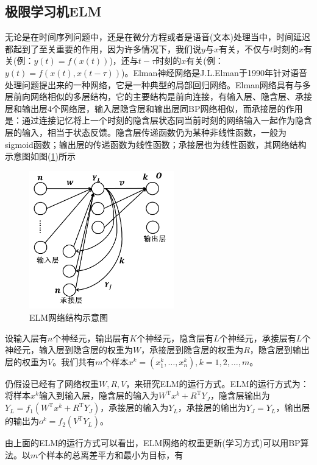 {    \subsection{极限学习机ELM}
        \par
        无论是在时间序列问题中，还是在微分方程或者是语音(文本)处理当中，时间延迟都起到了至关重要的作用，因为许多情况下，我们说$y$与$x$有关，不仅与$t$时刻的$x$有关(例：$y(t) = f(x(t))$)，还与$t-\tau$时刻的$x$有关(例：$y(t) = f(x(t),x(t-\tau))$)。Elman神经网络是J.L.Elman于1990年针对语音处理问题提出来的一种网络，它是一种典型的局部回归网络。Elman网络具有与多层前向网络相似的多层结构，它的主要结构是前向连接，有输入层、隐含层、承接层和输出层4个网络层，输入层隐含层和输出层同BP网络相似，而承接层的作用是：通过连接记忆将上一个时刻的隐含层状态同当前时刻的网络输入一起作为隐含层的输入，相当于状态反馈。隐含层传递函数仍为某种非线性函数，一般为sigmoid函数；输出层的传递函数为线性函数；承接层也为线性函数，其网络结构示意图如图(\ref{fig:ELM网络结构示意图})所示
            \begin{figure}[H]
            \centering
            \includegraphics[height=6cm]{images/ELM_network_structure.jpg}
            \caption{ELM网络结构示意图}
            \label{fig:ELM网络结构示意图}
            \end{figure}
        设输入层有$n$个神经元，输出层有$K$个神经元，隐含层有$L$个神经元，承接层有$L$个神经元，输入层到隐含层的权重为$W$，承接层到隐含层的权重为$R$，隐含层到输出层的权重为$V$。我们共有$m$个样本$x^k = (x_1^k,\dots,x_n^k),k=1,2,\dots,m$。
        \par
        仍假设已经有了网络权重$W,R,V$，来研究ELM的运行方式。ELM的运行方式为：将样本$x^k$输入到输入层，隐含层的输入为$W^\mathrm{T}x^k+ R^\mathrm{T}Y_J$，隐含层输出为$Y_L= f_1(W^\mathrm{T}x^k+R^\mathrm{T}Y_J)$，承接层的输入为$Y_L$，承接层的输出为$Y_J = Y_L$，输出层的输出为$o^k = f_2(V^\mathrm{T}Y_L)$。
        \par
        由上面的ELM的运行方式可以看出，ELM网络的权重更新(学习方式)可以用BP算法。以$m$个样本的总离差平方和最小为目标，有
}
